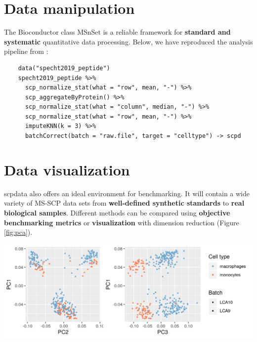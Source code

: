 \documentclass{article}
\newcommand{\hcode}[2][lgray]{{\ttfamily\color{vdgray}\colorbox{#1}{#2}}}
\begin{document}
\begin{multicols}{2}
\begin{minipage}[t]{\linewidth}
  \section*{\huge Data manipulation}
  \large
  The Bioconductor class \hcode{MSnSet} is a reliable framework for \textbf{standard and systematic} quantitative data processing. Below, we have reproduced the analysis pipeline from \cite{Specht2019-jm}:
  \begin{lstlisting}
    data("specht2019_peptide")
    specht2019_peptide %>% 
      scp_normalize_stat(what = "row", mean, "-") %>%
      scp_aggregateByProtein() %>%
      scp_normalize_stat(what = "column", median, "-") %>%
      scp_normalize_stat(what = "row", mean, "-") %>%
      imputeKNN(k = 3) %>%
      batchCorrect(batch = "raw.file", target = "celltype") -> scpd
  \end{lstlisting}
\end{minipage}


\noindent
\begin{minipage}[t]{\linewidth}
  \vspace{0.5cm}
  \section*{\huge Data visualization}
  \large
  \hcode{scpdata} also offers an ideal environment for benchmarking. It will contain a wide variety of MS-SCP data sets from \textbf{well-defined synthetic standards} to \textbf{real biological samples}. Different methods can be compared using \textbf{objective benchmarking metrics} or \textbf{visualization} with dimension reduction (Figure \ref{fig:pca}).
  \begin{center}
    \includegraphics[width=\textwidth]{figs/PCA.png}
  \end{center}
  \label{fig:pca}


\end{minipage}
\end{multicols}
\end{document}
